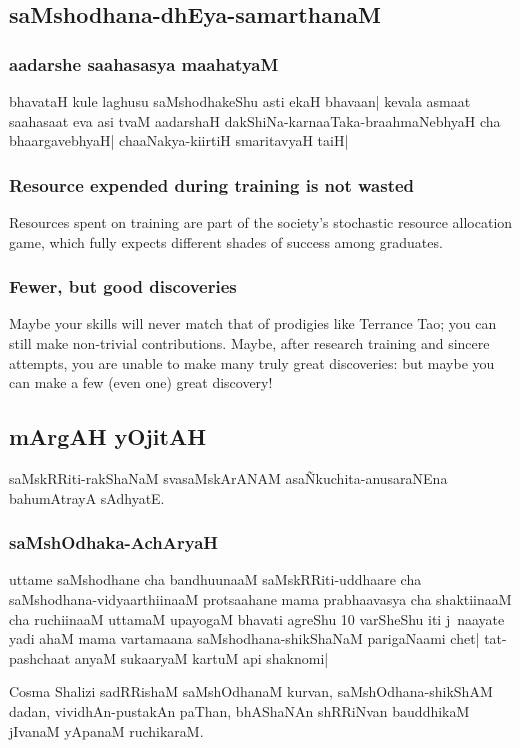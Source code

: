 \documentclass[oneside, article]{memoir}
\begin{document}
\subsection{saMshodhana-dhEya-samarthanaM}
\subsubsection{aadarshe saahasasya maahatyaM}
bhavataH kule laghusu saMshodhakeShu asti ekaH bhavaan| kevala asmaat saahasaat eva asi tvaM aadarshaH dakShiNa-karnaaTaka-braahmaNebhyaH cha bhaargavebhyaH| chaaNakya-kiirtiH smaritavyaH taiH|

\subsubsection{Resource expended during training is not wasted}
Resources  spent on training are part of the society's stochastic resource allocation game, which fully expects different shades of success among graduates.

\subsubsection{Fewer, but good discoveries}
Maybe your skills will never match that of prodigies like Terrance Tao; you can still make non-trivial contributions. Maybe, after research training and sincere attempts, you are unable to make many truly great discoveries: but maybe you can make a few (even one) great discovery!


\subsection{mArgAH yOjitAH}
saMskRRiti-rakShaNaM svasaMskArANAM asa\~Nkuchita-anusaraNEna bahumAtrayA sAdhyatE.

\subsubsection{saMshOdhaka-AchAryaH}
uttame saMshodhane cha bandhuunaaM saMskRRiti-uddhaare cha saMshodhana-vidyaarthiinaaM protsaahane mama prabhaavasya cha shaktiinaaM cha ruchiinaaM uttamaM upayogaM bhavati agreShu 10 varSheShu iti j~naayate yadi ahaM mama vartamaana saMshodhana-shikShaNaM parigaNaami chet| tat-pashchaat anyaM sukaaryaM kartuM api shaknomi|

Cosma Shalizi sadRRishaM saMshOdhanaM kurvan, saMshOdhana-shikShAM dadan, vividhAn-pustakAn paThan, bhAShaNAn shRRiNvan bauddhikaM jIvanaM yApanaM ruchikaraM.
\end{document}
